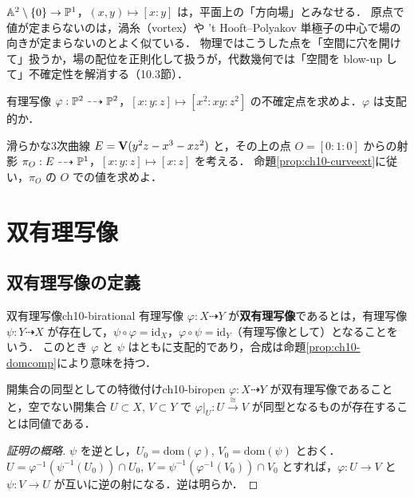 \begin{physbox}[特異な場の配位]
$\mathbb{A}^2\setminus\{0\}\to\mathbb{P}^1$，$(x,y)\mapsto[x:y]$ は，平面上の「方向場」とみなせる．
原点で値が定まらないのは，渦糸（vortex）や 't Hooft--Polyakov 単極子の中心で場の向きが定まらないのとよく似ている．
物理ではこうした点を「空間に穴を開けて」扱うか，場の配位を正則化して扱うが，代数幾何では「空間を blow-up して」不確定性を解消する（10.3節）．
\end{physbox}

有理写像 $\varphi:\mathbb{P}^2\dashrightarrow\mathbb{P}^2$，$[x:y:z]\mapsto[x^2:xy:z^2]$ の不確定点を求めよ．$\varphi$ は支配的か．

滑らかな3次曲線 $E=\mathbf{V}(y^2z-x^3-xz^2)$ と，その上の点 $O=[0:1:0]$ からの射影 $\pi_O:E\dashrightarrow\mathbb{P}^1$，$[x:y:z]\mapsto[x:z]$ を考える．
命題\ref{prop:ch10-curveext}に従い，$\pi_O$ の $O$ での値を求めよ．

\section{双有理写像}

\subsection{双有理写像の定義}

\begin{mydef}{双有理写像}{ch10-birational}
有理写像 $\varphi:X\dashrightarrow Y$ が\textbf{双有理写像}であるとは，有理写像 $\psi:Y\dashrightarrow X$ が存在して，$\psi\circ\varphi=\mathrm{id}_X$，$\varphi\circ\psi=\mathrm{id}_Y$（有理写像として）となることをいう．
このとき $\varphi$ と $\psi$ はともに支配的であり，合成は命題\ref{prop:ch10-domcomp}により意味を持つ．
\end{mydef}

\begin{myprop}{開集合の同型としての特徴付け}{ch10-biropen}
$\varphi:X\dashrightarrow Y$ が双有理写像であることと，空でない開集合 $U\subset X$, $V\subset Y$ で $\varphi|_U:U\xrightarrow{\ \cong\ }V$ が同型となるものが存在することは同値である．
\end{myprop}

\begin{proof}[証明の概略]
$\psi$ を逆とし，$U_0=\mathrm{dom}(\varphi)$, $V_0=\mathrm{dom}(\psi)$ とおく．$U=\varphi^{-1}(\psi^{-1}(U_0))\cap U_0$, $V=\psi^{-1}(\varphi^{-1}(V_0))\cap V_0$ とすれば，$\varphi:U\to V$ と $\psi:V\to U$ が互いに逆の射になる．逆は明らか．
\end{proof}

